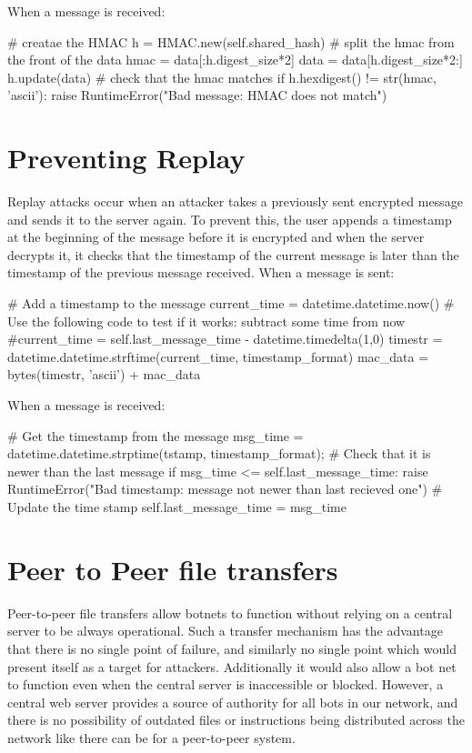 \documentclass[12pt,a4paper]{article}
\begin{document}
When a message is received:
\begin{center}\begin{python}
# creatae the HMAC
h = HMAC.new(self.shared_hash)
# split the hmac from the front of the data
hmac = data[:h.digest_size*2]
data = data[h.digest_size*2:]
h.update(data)
# check that the hmac matches
if h.hexdigest() != str(hmac, 'ascii'):
    raise RuntimeError("Bad message: HMAC does not match")
\end{python}\end{center}

\section{Preventing Replay}
Replay attacks occur when an attacker takes a previously sent encrypted message and sends it to the server again. To prevent this, the user appends a timestamp at the beginning of the message before it is encrypted and when the server decrypts it, it checks that the timestamp of the current message is later than the timestamp of the previous message received.
When a message is sent:
\begin{center}\begin{python}
# Add a timestamp to the message
current_time = datetime.datetime.now()
# Use the following code to test if it works: subtract some time from now
#current_time = self.last_message_time - datetime.timedelta(1,0)
timestr = datetime.datetime.strftime(current_time, timestamp_format)
mac_data = bytes(timestr, 'ascii') + mac_data
\end{python}\end{center}

When a message is received:
\begin{center}\begin{python}
# Get the timestamp from the message
msg_time = datetime.datetime.strptime(tstamp, timestamp_format);
# Check that it is newer than the last message
if msg_time <= self.last_message_time:
    raise RuntimeError("Bad timestamp: message not newer than last recieved one")
# Update the time stamp
self.last_message_time = msg_time
\end{python}\end{center}

\section{Peer to Peer file transfers}
Peer-to-peer file transfers allow botnets to function without relying on a central server to be always operational. Such a transfer mechanism has the advantage that there is no single point of failure, and similarly no single point which would present itself as a target for attackers. Additionally it would also allow a bot net to function even when the central server is inaccessible or blocked. However, a central web server provides a source of authority for all bots in our network, and there is no possibility of outdated files or instructions being distributed across the network like there can be for a peer-to-peer system.
\end{document}
